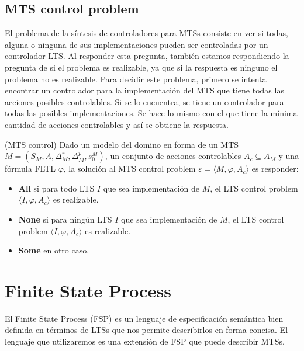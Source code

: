 \subsection{MTS	control problem}

El problema de la síntesis de controladores para MTSs \cite{MTSControl} consiste en ver si todas, alguna o ninguna de sus 
implementaciones pueden ser controladas por un controlador LTS. Al responder esta pregunta, también estamos respondiendo 
la pregunta de si el problema es realizable, ya que si la respuesta es ninguno el problema no es realizable. Para decidir 
este problema, primero se intenta encontrar un controlador para la implementación del MTS que tiene todas las acciones 
posibles controlables. Si se lo encuentra, se tiene un controlador para todas las posibles implementaciones. Se hace lo 
mismo con el que tiene la mínima cantidad de acciones controlables y así se obtiene la respuesta.

\begin{definition}{(MTS control)}
Dado un modelo del domino en forma de un MTS $M = (S_{M}, A, \Delta_{M}^{r}, \Delta_{M}^{p}, s_{0}^{M})$, un conjunto de 
acciones controlables $A_{c} \subseteq A_{M}$ y una fórmula FLTL $\varphi$, la solución al MTS control problem 
$\varepsilon = \langle M, \varphi, A_{c} \rangle$ es responder:

\begin{itemize}

\item
\textbf{All} si para todo LTS $I$ que sea implementación de $M$, el LTS control problem $\langle I, \varphi, A_{c} \rangle$ es realizable.

\item
\textbf{None} si para ningún LTS $I$ que sea implementación de $M$, el LTS control problem $\langle I, \varphi, A_{c} \rangle$ es realizable.

\item
\textbf{Some} en otro caso.

\end{itemize}

\end{definition}

\section{Finite State Process}
El Finite State Process (FSP) \cite{FSP} es un lenguaje de especificación semántica bien definida en términos de LTSs que nos permite describirlos 
en forma concisa. El lenguaje que utilizaremos es una extensión de FSP que 
puede describir MTSs.